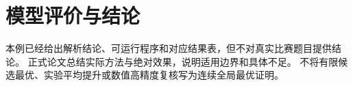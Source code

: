 \section{模型评价与结论}
本例已经给出解析结论、可运行程序和对应结果表，但不对真实比赛题目提供结论。
正式论文总结实际方法与绝对效果，说明适用边界和具体不足。
不将有限候选最优、实验平均提升或数值高精度复核写为连续全局最优证明。
